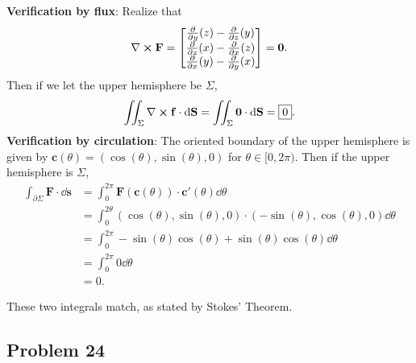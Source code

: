 \documentclass[11pt]{article}
\renewcommand{\vec}[1]{\mathbf{#1}}
\renewcommand{\curl}{\nabla \cross}
\begin{document}
\textbf{Verification by flux}: Realize that
\[
	\curl \mathbf{F} = \begin{bmatrix} \pdv{y} (z) - \pdv{z} (y) \\ \pdv{z} (x) - \pdv{x} (z) \\ \pdv{x} (y) - \pdv{y} (x) \end{bmatrix} = \vec{0}.
\]
Then if we let the upper hemisphere be $\Sigma$,
\[
	\iint_{\Sigma} \curl \mathbf{f} \cdot \dd{\vec{S}} = \iint_{\Sigma} \vec{0} \cdot \dd{\vec{S}} = \boxed{0}.
\]
\textbf{Verification by circulation}: The oriented boundary of the upper hemisphere is given by $\vec{c}(\theta) = (\cos(\theta), \sin(\theta), 0)$ for $\theta \in [0, 2\pi)$. Then if the upper hemisphere is $\Sigma$, 
\begin{align*}
	\int_{\partial \Sigma} \mathbf{F} \cdot \dd{\vec{s}} &= \int_{0}^{2\pi} \mathbf{F}(\vec{c}(\theta)) \cdot \vec{c}'(\theta) \dd{\theta} \\
	&= \int_{0}^{2\theta} (\cos(\theta), \sin(\theta), 0) \cdot (-\sin(\theta), \cos(\theta), 0) \dd{\theta} \\
	&= \int_{0}^{2\pi} -\sin(\theta)\cos(\theta) + \sin(\theta)\cos(\theta) \dd{\theta}  \\
	&= \int_{0}^{2\pi} 0 \dd{\theta} \\
	&= \boxed{0}.
\end{align*}

These two integrals match, as stated by Stokes' Theorem.


\subsection*{Problem 24}
\end{document}
